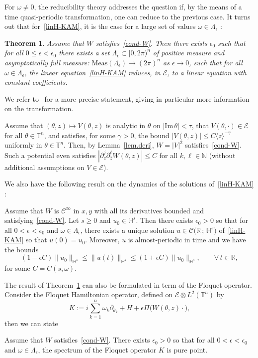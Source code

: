 \documentclass[10pt]{amsart}
\newtheorem{theo}{Theorem}[section]
\theoremstyle{definition}\newtheorem{defi}[theo]{Definition}\newtheorem{rema}[theo]{Remark}\newtheorem{exam}[theo]{Example}\newtheorem{exem}[theo]{Example}\newtheorem{nota}[theo]{Notation}
\newcommand{\R}{\mathbb{R}}
\newcommand{\T}{\mathbb{T}}
\newcommand{\HH}{\mathbb{H}}
\newcommand{\N}{\mathbb{N}}
\newcommand{\E}{\mathcal{E}}
\newcommand{\clC}{\mathcal{C}}
\newcommand*\eps{\epsilon}
\newcommand{\om}{\omega}
\newcommand{\ov}{\overline}
\newcommand{\<}{\langle}
\renewcommand{\>}{\rangle}
\let\oldforall\forall
\renewcommand*{\forall}{\mathrel{\oldforall}}
\begin{document}
For $\om \neq 0$, the reducibility theory addresses the question if, by the means of a time quasi-periodic transformation, one can reduce to the previous case. It turns out that for~\eqref{linH-KAM}, it is the case for a large set of values $\om \in \Lambda_{\eps} $ :

\begin{theo}\label{theo-lin-LLL}
Assume that $W$ satisfies~\eqref{cond-W}. Then there exists $\epsilon_0$ such that for all $0\leq\epsilon<\epsilon_0$ there exists a set $\Lambda_{\eps} \subset [0,2\pi)^n$ of positive measure and asymptotically full measure: $\mbox{Meas}(\Lambda_{\eps}) \to (2\pi)^n$ as $\epsilon \to 0$, such that for all
$\omega\in \Lambda_{\eps} $, the linear equation~\eqref{linH-KAM} reduces, in $\E$, to a linear equation with constant coefficients.
\end{theo}

We refer to~\cite[Theorem~7.1]{Grebert-Thomann} for a more precise statement, giving in particular more information on the transformation.

Assume that $(\theta, z) \mapsto V(\theta,z)$ is analytic in $\theta$ on $|\text{Im}\,\theta|<\tau$, that $V(\theta, \cdot) \in \E$ for all $\theta \in \T^n$, and satisfies, for some $\gamma>0$, the bound $|V(\theta,z)|\leq C\<z\>^{-\gamma}$ uniformly in $\theta \in \T^n$. Then, by Lemma~\ref{lem.deri}, $W=|V|^2$ satisfies~\eqref{cond-W}. Such a potential even satisfies $|\partial^j_{z}\partial^{\ell}_{\ov z}W(\theta,z)|\leq C$ for all $k, \ell \in \N$ (without additional assumptions on $V \in \E$).

We also have the following result on the dynamics of the solutions of~\eqref{linH-KAM} :
\begin{coro}
Assume that $W$ is $\clC^{\infty}$ in $x,y$ with all its derivatives bounded and satisfying~\eqref{cond-W}. Let $s\geq 0$ and $u_{0}\in \HH^{s}$. Then there exists $\eps_{0}>0$ so that for all $0<\eps<\eps_{0}$ and $\om \in \Lambda_{\eps}$, there exists a unique solution $u \in \clC\big(\R\,;\,\HH^{s}\big)$ of~\eqref{linH-KAM} so that $u(0)=u_{0}$. Moreover, $u$ is almost-periodic in time and we have the bounds
\[
(1-\eps C)\|u_{0}\|_{\HH^{s}}\leq \|u(t)\|_{\HH^{s}}\leq (1+\eps C)\|u_{0}\|_{\HH^{s}}, \qquad \forall \,t\in \R,
\]
for some $C=C(s,\om)$.
\end{coro}


The result of Theorem~\ref{theo-lin-LLL} can also be formulated in term of the Floquet operator. Consider the Floquet Hamiltonian operator, defined on $\E\otimes L^2(\T^n)$ by
\[
K:=i\sum_{k=1}^n\omega_k \partial_{ \theta_k} +H +\epsilon \Pi \big(W(\theta,z) \cdot \big),
\]
then we can state
\begin{coro}
Assume that $W$ satisfies~\eqref{cond-W}. There exists $\eps_{0}>0$ so that for all $0<\eps<\eps_{0}$ and $\om \in \Lambda_{\eps}$, the spectrum of the Floquet operator $K$ is pure point.
\end{coro}
\end{document}
